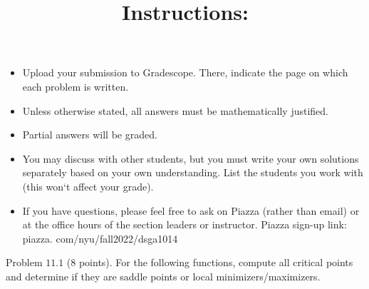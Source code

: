 \documentclass[10pt]{article}
\title{Instructions: }
\author{}
\date{}
\begin{document}
\maketitle
\begin{itemize}
  \item Upload your submission to Gradescope. There, indicate the page on which each problem is written.

  \item Unless otherwise stated, all answers must be mathematically justified.

  \item Partial answers will be graded.

  \item You may discuss with other students, but you must write your own solutions separately based on your own understanding. List the students you work with (this won`t affect your grade).

  \item If you have questions, please feel free to ask on Piazza (rather than email) or at the office hours of the section leaders or instructor. Piazza sign-up link: piazza. com/nyu/fall2022/dsga1014

\end{itemize}

Problem $11.1$ (8 points). For the following functions, compute all critical points and determine if they are saddle points or local minimizers/maximizers.
\end{document}
